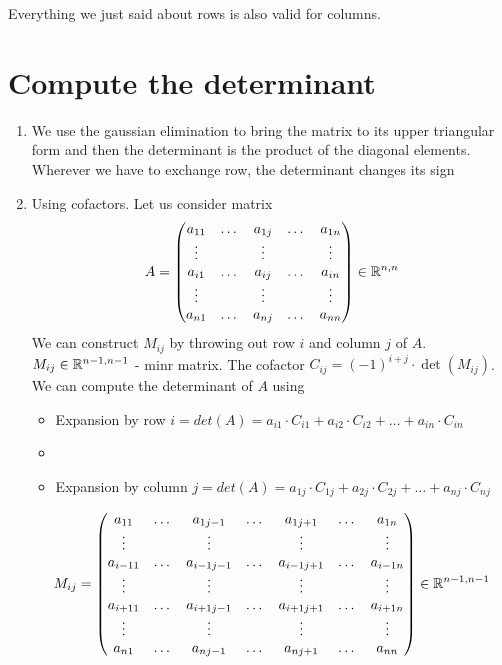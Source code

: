 \begin{remark}
Everything we just said about rows is also valid for columns.	
\end{remark}

\section{Compute the determinant}
\begin{enumerate}
\item We use the gaussian elimination to bring the matrix to its upper triangular form and then the determinant is the product of the diagonal elements. Wherever we have to exchange row, the determinant changes its sign
\item Using cofactors. Let us consider matrix
\[
A = \begin{pmatrix}
a_{11} & \dots &a_{1j} & \dots &a_{1n}\\
\vdots & {} & \vdots & {} & \vdots \\
a_{i1} & \dots &a_{ij} & \dots &a_{in}\\
\vdots & {} & \vdots & {} & \vdots \\
a_{n1} & \dots &a_{nj} & \dots &a_{nn}\\
\end{pmatrix} \in\mathbb{R}^{n,n}
\]
We can construct $M_{ij}$ by throwing out row $i$ and column $j$ of $A$. $M_{ij}\in\mathbb{R}^{n-1,n-1}$ - minr matrix. The cofactor $C_{ij} = (-1)^{i+j}\cdot\det(M_{ij})$. We can compute the determinant of $A$ using 
\begin{itemize}
\item Expansion by row $i=det(A)=a_{i1}\cdot C_{i1}+a_{i2}\cdot C_{i2}+\dots+a_{in}\cdot C_{in}$
\item \item Expansion by column $j=det(A)=a_{1j}\cdot C_{1j}+a_{2j}\cdot C_{2j}+\dots+a_{nj}\cdot C_{nj}$
\end{itemize}
\[
M_{ij} = \begin{pmatrix}
a_{11} & \dots & a_{1j-1} & \dots & a_{1j+1} & \dots & a_{1n}\\
\vdots & {} & \vdots & {} & \vdots & {} & \vdots\\
a_{i-11} & \dots & a_{i-1j-1} & \dots & a_{i-1j+1} & \dots & a_{i-1n}\\
\vdots & {} & \vdots & {} & \vdots & {} & \vdots\\
a_{i+11} & \dots & a_{i+1j-1} & \dots & a_{i+1j+1} & \dots & a_{i+1n}\\
\vdots & {} & \vdots & {} & \vdots & {} & \vdots\\
a_{n1} & \dots & a_{nj-1} & \dots & a_{nj+1} & \dots & a_{nn}\\
\end{pmatrix}\in\mathbb{R}^{n-1,n-1}
\]
\end{enumerate}

